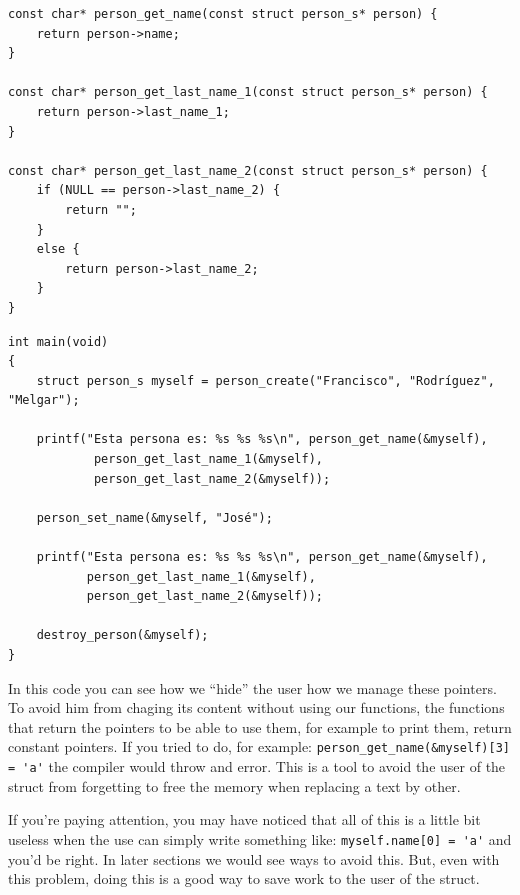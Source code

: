 \documentclass[a4paper]{article}
\begin{document}
\noindent
\begin{minipage}[H]{\linewidth}
\mbox{}
\begin{lstlisting}[style=C,
caption={Struct with const pointers -- Functions to retrieve information},
label={lst:structConstGetters}]
const char* person_get_name(const struct person_s* person) {
    return person->name;
}

const char* person_get_last_name_1(const struct person_s* person) {
    return person->last_name_1;
}

const char* person_get_last_name_2(const struct person_s* person) {
    if (NULL == person->last_name_2) {
        return "";
    }
    else {
        return person->last_name_2;
    }
}

\end{lstlisting}
\end{minipage}

\noindent
\begin{minipage}[H]{\linewidth}
\mbox{}
\begin{lstlisting}[style=C,
caption={Struct with const pointers -- \texttt{main} function},
label={lst:structConstMain}]
int main(void)
{
    struct person_s myself = person_create("Francisco", "Rodríguez", "Melgar");

    printf("Esta persona es: %s %s %s\n", person_get_name(&myself),
            person_get_last_name_1(&myself),
            person_get_last_name_2(&myself));

    person_set_name(&myself, "José");

    printf("Esta persona es: %s %s %s\n", person_get_name(&myself),
           person_get_last_name_1(&myself),
           person_get_last_name_2(&myself));

    destroy_person(&myself);
}
\end{lstlisting}
\end{minipage}

In this code you can see how we ``hide'' the user how we manage these pointers.
To avoid him from chaging its content without using our functions, the functions
that return the pointers to be able to use them, for example to print them,
return constant pointers. If you tried to do, for example:
\lstinline[style=C]!person_get_name(&myself)[3] = 'a'! the compiler would throw
and error. This is a tool to avoid the user of the struct from forgetting to
free the memory when replacing a text by other.

If you're paying attention, you may have noticed that all of this is a little
bit useless when the use can simply write something like:
\verb!myself.name[0] = 'a'! and you'd be right. In later sections we would see
ways to avoid this. But, even with this problem, doing this is a good way to
save work to the user of the struct.
\end{document}
